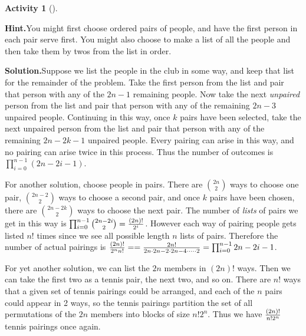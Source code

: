 \documentclass[10pt,]{book}
\theoremstyle{plain}
\theoremstyle{definition}
\newtheorem{activity}[project]{Activity}
\numberwithin{equation}{chapter}
\begin{document}
\begin{activity}[]
\begin{enumerate}[label=(\alph*)]
\end{enumerate}
\par\medskip\noindent%
\textbf{Hint.}\quad You might first choose ordered pairs of people, and have the first person in each pair serve first. You might also choose to make a list of all the people and then take them by twos from the list in order.\par\medskip\noindent%
\textbf{Solution.}\quad Suppose we list the people in the club in some way, and keep that list for the remainder of the problem. Take the first person from the list and pair that person with any of the \(2n-1\) remaining people. Now take the next \emph{unpaired} person from the list and pair that person with any of the remaining \(2n-3\) unpaired people. Continuing in this way, once \(k\) pairs have been selected, take the next unpaired person from the list and pair that person with any of the remaining \(2n-2k-1\) unpaired people. Every pairing can arise in this way, and no pairing can arise twice in this process. Thus the number of outcomes is \(\prod_{i=0}^{n-1} (2n-2i-1)\).%
\par
For another solution, choose people in pairs. There are \(2n\choose 2\) ways to choose one pair, \(2n-2\choose 2\) ways to choose a second pair, and once \(k\) pairs have been chosen, there are \(2n-2k\choose 2\) ways to choose the next pair. The number of \emph{lists} of pairs we get in this way is \(\prod_{i=0}^{n-1}
{2n-2i\choose 2}= {(2n)!\over 2^i}\). However each way of pairing people gets listed \(n!\) times since we see all possible length \(n\) lists of pairs. Therefore the number of actual pairings is \({(2n)!\over 2^n n!}= ={2n!\over
2n\cdot2n-2\cdot2n-4\cdot \cdots\cdot 2} =  \prod_{i=0}^{n-1} 2n-2i-1\).%
\par
For yet another solution, we can list the \(2n\) members in \((2n)!\) ways. Then we can take the first two as a tennis pair, the next two, and so on. There are \(n!\) ways that a given set of tennis pairings could be arranged, and each of the \(n\) pairs could appear in 2 ways, so the tennis pairings partition the set of all permutations of the \(2n\) members into blocks of size \(n!2^n\). Thus we have \((2n)!\over n!2^n\) tennis pairings once again.%
\end{activity}
\end{document}
